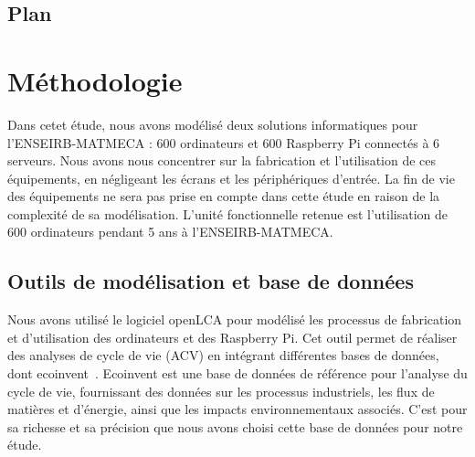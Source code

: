 \documentclass[12pt,a4paper]{paper}
\begin{document}
\subsection{Plan}
\noindent \lipsum[1-2]

\section{Méthodologie}
Dans cetet étude, nous avons modélisé deux solutions informatiques pour l'ENSEIRB-MATMECA : 600 ordinateurs et 600 Raspberry Pi connectés à 6 serveurs. Nous avons nous concentrer sur la fabrication et l'utilisation de ces équipements, en négligeant les écrans et les périphériques d'entrée. La fin de vie des équipements ne sera pas prise en compte dans cette étude en raison de la complexité de sa modélisation. L'unité fonctionnelle retenue est l'utilisation de 600 ordinateurs pendant 5 ans à l'ENSEIRB-MATMECA.

\subsection{Outils de modélisation et base de données}
Nous avons utilisé le logiciel openLCA pour modélisé les processus de fabrication et d'utilisation des ordinateurs et des Raspberry Pi. Cet outil permet de réaliser des analyses de cycle de vie (ACV) en intégrant différentes bases de données, dont ecoinvent~\cite{ecoinvent2024}. Ecoinvent est une base de données de référence pour l'analyse du cycle de vie, fournissant des données sur les processus industriels, les flux de matières et d'énergie, ainsi que les impacts environnementaux associés. C'est pour sa richesse et sa précision que nous avons choisi cette base de données pour notre étude.
\end{document}
